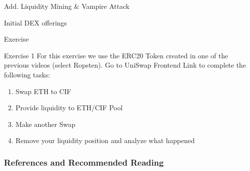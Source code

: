 \documentclass[]{beamer}
\begin{document}
\begin{frame}{Add. Liquidity Mining \& Vampire Attack}

\end{frame}


\begin{frame}{Initial DEX offerings}

\end{frame}


\begin{frame}{Exercise}
	\begin{exercise}{Exercise 1}
	For this exercise we use the ERC20 Token created in one of the previous videos (select Ropsten). Go to UniSwap Frontend Link to complete the following tasks:
	
		\begin{enumerate}
			\item Swap ETH to CIF
			\item Provide liquidity to ETH/CIF Pool
			\item Make another Swap
			\item Remove your liquidity position and analyze what happened
		\end{enumerate}
	\end{exercise}
\end{frame}



\begin{frame}%
\frametitle{References and Recommended Reading}
	
	
\end{frame}
\end{document}
